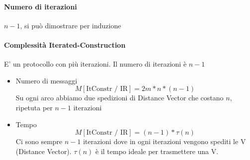 \paragraph{Numero di iterazioni} $n-1$, si può dimostrare per induzione

\paragraph{Complessità Iterated-Construction}
E' un protocollo con più iterazioni. Il numero di iterazioni è $n-1$
\begin{itemize}
    \item Numero di messaggi
    $$M[\text{ItConstr / IR}] = 2m * n * (n-1)$$
    Su ogni arco abbiamo due spedizioni di Distance Vector che costano $n$, ripetuta per $n-1$ iterazioni
    \item Tempo
    $$M[\text{ItConstr / IR}] = (n-1) * \tau(n)$$
    Ci sono sempre $n-1$ iterazioni dove in ogni iterazioni vengono spediti le V (Distance Vector). $\tau(n)$ è il tempo ideale per trasmettere una V. 
\end{itemize}



